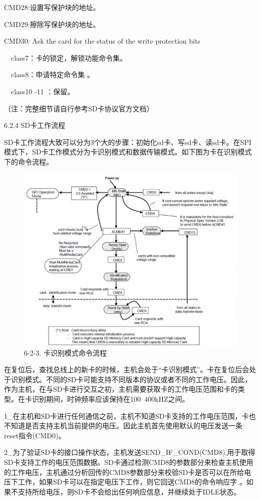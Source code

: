 CMD28:设置写保护块的地址。

CMD29:擦除写保护块的地址。

CMD30: Ask the card for the status of the write protection bits

　class7：卡的锁定，解锁功能命令集。

　class8：申请特定命令集 。

　class10 -11 ：保留。

（注：完整细节请自行参考SD卡协议官方文档）

6.2.4 SD卡工作流程

SD卡工作流程大致可以分为3个大的步骤：初始化sd卡、写sd卡、读sd卡。在SPI模式下，SD卡工作模式分为卡识别模式和数据传输模式。如下图为卡在识别模式下的命令流程。

\begin{figure}[H]
    \centering
    \includegraphics{figures/06-02-命令流程.png}
    \caption{6-2-3. 卡识别模式命令流程}
\end{figure}

在复位后，查找总线上的新卡的时候，主机会处于“卡识别模式”。卡在复位后会处于识别模式。不同的SD卡可能支持不同版本的协议或者不同的⼯作电压。因此，作为主机，在与SD卡进行交互之初，主机需要获取卡的工作电压范围和卡的类型。在卡识别期间，时钟频率应该保持在100~400kHZ之间。

1_在主机和SD卡进行任何通信之前，主机不知道SD卡支持的工作电压范围，卡也不知道是否支持主机当前提供的电压。因此主机首先使用默认的电压发送一条reset指令(CMD0)。

2_为了验证SD卡的接口操作状态，主机发送SEND_IF_COND(CMD8),用于取得SD卡支持工作的电压范围数据。SD卡通过检测CMD8的参数部分来检查主机使用的工作电压，主机通过分析回传的CMD8参数部分来校验SD卡是否可以在所给电压下工作，如果SD卡可以在指定电压下工作，则它回送CMD8的命令响应字 。如果不支持所给电压，则SD卡不会给出任何响应信息，并继续处于IDLE状态。

